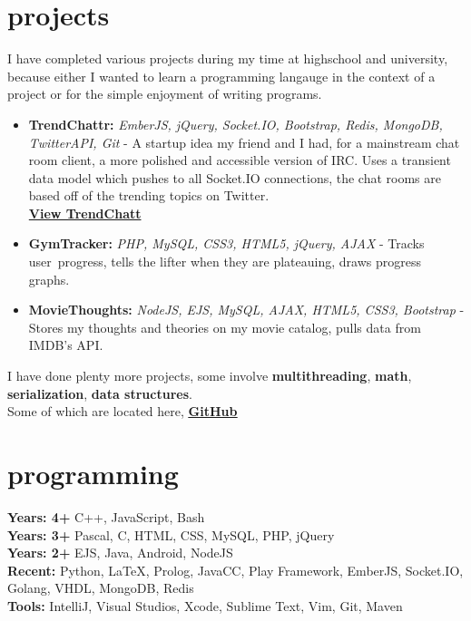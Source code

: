 \documentclass[]{friggeri-cv} %
\begin{document}
\section{projects}
I have completed various projects during my time at highschool and university, because either I wanted to learn a programming langauge
in the context of a project or for the simple enjoyment of writing programs.
\begin{itemize}
    \item \textbf{TrendChattr:} \emph{EmberJS, jQuery, Socket.IO, Bootstrap, Redis, MongoDB, TwitterAPI, Git} -
        A startup idea my friend and I had, for a mainstream chat room client, a more polished and accessible version of IRC. Uses a transient data model which pushes
        to all Socket.IO connections, the chat rooms are based off of the trending topics on Twitter. \\
        {\footnotesize \textbf{\href{http://chat.trendchattr.com/\#/rooms}{View TrendChatt}}}

    \item \textbf{GymTracker:} \emph{PHP, MySQL, CSS3, HTML5, jQuery, AJAX} -
        Tracks user progress, tells the lifter when they are plateauing, draws progress graphs.

    \item \textbf{MovieThoughts:} \emph{NodeJS, EJS, MySQL, AJAX, HTML5, CSS3, Bootstrap} -
        Stores my thoughts and theories on my movie catalog, pulls data from IMDB's API.
\end{itemize}
I have done plenty more projects, some involve \textbf{multithreading}, \textbf{math}, \textbf{serialization}, \textbf{data structures}. \\
Some of which are located here, \underline{\textbf{\href{http://github.com/Compulsed/}{GitHub}}}


\section{programming}
    \textbf{Years: 4+} C++, JavaScript, Bash \\
    \textbf{Years: 3+} Pascal, C, HTML, CSS, MySQL, PHP, jQuery \\
    \textbf{Years: 2+} EJS, Java, Android, NodeJS \\
    \textbf{Recent:}  Python, LaTeX, Prolog, JavaCC, Play Framework, EmberJS, Socket.IO, Golang, VHDL, MongoDB, Redis\\
    \textbf{Tools:} IntelliJ, Visual Studios, Xcode, Sublime Text, Vim, Git, Maven
\end{document}
